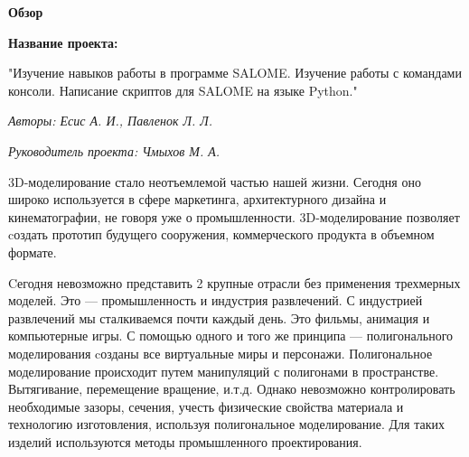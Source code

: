 \documentclass[a4paper,12pt]{article}
\theoremstyle{plain} %
\theoremstyle{definition} %
\theoremstyle{remark} %
\begin{document}
	
	\begin{center}
		
		{\Large\textbf{Обзор}}
		
		\textbf{Название проекта: }
		
		"Изучение навыков работы в программе SALOME. Изучение работы с командами консоли. Написание скриптов для SALOME на языке Python."
		
		\textit{Авторы: Есис А. И., Павленок Л. Л.}
		
		\textit{Руководитель проекта: Чмыхов М. А.}
		
	\end{center}
	
	3D-моделирование стало неотъемлемой частью нашей жизни. Сегодня оно широко используется в сфере маркетинга, архитектурного дизайна и кинематографии, не говоря уже о промышленности. 3D-моделирование позволяет cоздать прототип будущего сооружения, коммерческого продукта в объемном формате.
	
	Cегодня невозможно представить 2 крупные отрасли без применения трехмерных моделей. Это — промышленность и индустрия развлечений.
	С индустрией развлечений мы сталкиваемся почти каждый день. Это фильмы, анимация и компьютерные игры. С помощью одного и того же принципа — полигонального моделирования cозданы все виртуальные миры и персонажи. Полигональное моделирование происходит путем манипуляций с полигонами в пространстве. Вытягивание, перемещение вращение,  и.т.д. Однако невозможно контролировать необходимые зазоры, сечения, учесть физические свойства материала и технологию изготовления, используя полигональное моделирование. Для таких изделий используются методы промышленного проектирования.
	
\end{document}
